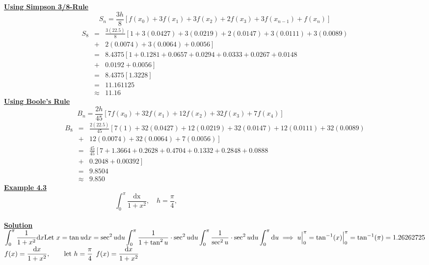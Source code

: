 \documentclass[12pt]{report}
\newcommand{\ubt}[1]{\textbf{\underline{#1}}}
\newcommand{\sps}{\\[0.2cm]}
\newcommand{\spn}[1]{\\[#1cm]}
\newcommand{\dsp}{\displaystyle}
\newcommand{\NI}{\noindent}
\begin{document}
	\NI\ubt{Using Simpson 3/8-Rule}
	$$
		S_n = \frac{3h}{8}\left[f(x_0) + 3f(x_1) + 3f(x_2)+ 2f(x_3) + 3f(x_{n-1})  + f(x_n)\right]
	$$
	\begin{eqnarray*}
		S_8 &=& \frac{3(22.5)}{8}\left[1 + 3(0.0427) + 3(0.0219) + 2(0.0147) + 3(0.0111) + 3(0.0089) \right.\\ 
		&+&\left. 2(0.0074) + 3(0.0064) + 0.0056\right]\spn{0.5}
		&=& 8.4375\left[1 + 0.1281 + 0.0657 + 0.0294 + 0.0333 + 0.0267 + 0.0148 \right.\\ 
		&+&\left. 0.0192 + 0.0056 \right]\spn{0.2}
		&=& 8.4375[1.3228]\spn{0.1}
		&=&11.161125\spn{0.1}
		&\approx& 11.16
	\end{eqnarray*}
	\newpage
	\NI\ubt{Using Boole's Rule}
	$$
		B_n = \frac{2h}{45}\left[7f(x_0) + 32f(x_1) + 12f(x_2)+ 32f(x_3) + 7f(x_4)\right]\qquad\qquad\qquad\qquad\qquad
	$$
	\begin{eqnarray*}
		B_8 &=& \frac{2(22.5)}{45}\left[7(1) + 32(0.0427) + 12(0.0219) + 32(0.0147) + 12(0.0111) + 32(0.0089) \right.\\ 
		&+&\left. 12(0.0074) + 32(0.0064) + 7(0.0056)\right]\spn{0.5}
		&=& \frac{45}{45}\left[7 + 1.3664 + 0.2628 + 0.4704 + 0.1332 + 0.2848 + 0.0888 \right.\\ 
		&+&\left. 0.2048 + 0.00392 \right]\spn{0.2}
		&=&9.8504\spn{0.1}
		&\approx& 9.850
	\end{eqnarray*}
	\newpage
	\ubt{Example 4.3}\\
	$$
	\int_{0}^{\pi} \frac{\text{dx}}{1 + x^2}, \quad h=\frac{\pi}{4}, \qquad\qquad\qquad\qquad\qquad\qquad\qquad\qquad\qquad\qquad
	$$\sps
	\ubt{Solution}\sps
	$\dsp
		\int_{0}^{\pi} \frac{1}{1 + x^2}\text{d}x\sps
		\text{Let } x = \tan u\sps
		\text{d}x = \sec^2u\text{d}u\sps
		\int_{0}^{\pi} \frac{1}{1 + \tan^2 u} \cdot \sec^2 u \text{d}u\sps
		\int_{0}^{\pi} \frac{1}{\sec^2 u} \cdot \sec^2 u \text{d}u\sps
		\int_{0}^{\pi}\text{d}u\sps
		\implies u\Big|_0^\pi \sps
		= \tan^{-1}(x)\Big|_0^\pi\sps
		= \tan^{-1}(\pi)\sps
		= 1.26262725\spn{0.5}
	$\sps
	$\dsp
		f(x) = \frac{\text{d}x}{1 + x^2}, \qquad \text{let }h=\frac{\pi}{4}\spn{0.5}
	$
	\newpage
	$\dsp
		f(x) = \frac{\text{d}x}{1 + x^2}\sps
	$\sps
\end{document}
